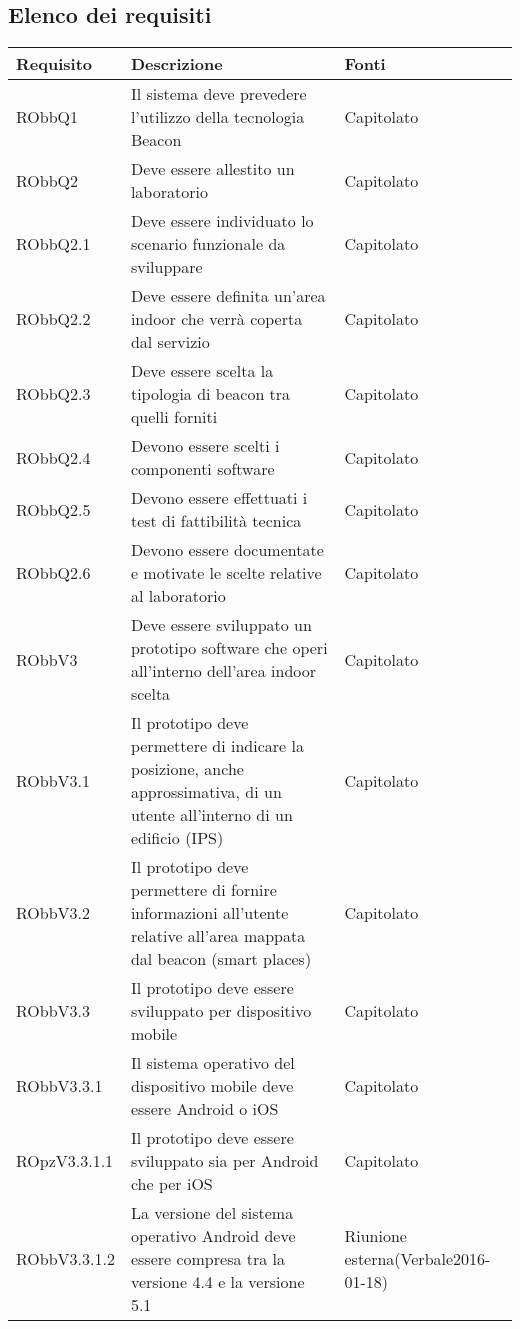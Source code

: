 \documentclass[../AnalisiDeiRequisiti.tex]{subfiles}
\begin{document}
	\subsection{Elenco dei requisiti}
		\begin{longtabu} to \textwidth {X X[2] X}
		\toprule
		\textbf{Requisito} & \textbf{Descrizione} & \textbf{Fonti}\\
		\midrule
		\endhead
		\midrule 
		RObbQ1 & Il sistema deve prevedere l'utilizzo della tecnologia Beacon & Capitolato \\ 
		\midrule 
		RObbQ2 & Deve essere allestito un laboratorio & Capitolato \\ 
		\midrule 
		RObbQ2.1 & Deve essere individuato lo scenario funzionale da sviluppare & Capitolato \\ 
		\midrule 
		RObbQ2.2 & Deve essere definita un'area indoor che verrà coperta dal servizio & Capitolato \\ 
		\midrule 
		RObbQ2.3 & Deve essere scelta la tipologia di beacon tra quelli forniti & Capitolato \\ 
		\midrule 
		RObbQ2.4 & Devono essere scelti i componenti software & Capitolato \\ 
		\midrule 
		RObbQ2.5 & Devono essere effettuati i test di fattibilità tecnica & Capitolato \\ 
		\midrule 
		RObbQ2.6 & Devono essere documentate e motivate le scelte relative al laboratorio & Capitolato \\ 
		\midrule 
		RObbV3 & Deve essere sviluppato un prototipo software che operi all'interno dell'area indoor scelta & Capitolato \\ 
		\midrule 
		RObbV3.1 & Il prototipo deve permettere di indicare la posizione, anche approssimativa, di un utente all'interno di un edificio (IPS) & Capitolato \\ 
		\midrule 
		RObbV3.2 & Il prototipo deve permettere di fornire informazioni all'utente relative all'area mappata dal beacon (smart places) & Capitolato \\ 
		\midrule 
		RObbV3.3 & Il prototipo deve essere sviluppato per dispositivo mobile & Capitolato \\ 
		\midrule 
		RObbV3.3.1 & Il sistema operativo del dispositivo mobile deve essere Android o iOS & Capitolato \\ 
		\midrule 
		ROpzV3.3.1.1 & Il prototipo deve essere sviluppato sia per Android che per iOS & Capitolato \\ 
		\midrule 
		RObbV3.3.1.2 & La versione del sistema operativo Android deve essere compresa tra la versione 4.4 e la versione 5.1 & Riunione esterna(Verbale2016-01-18) \\ 

\end{longtabu}
\end{document}

